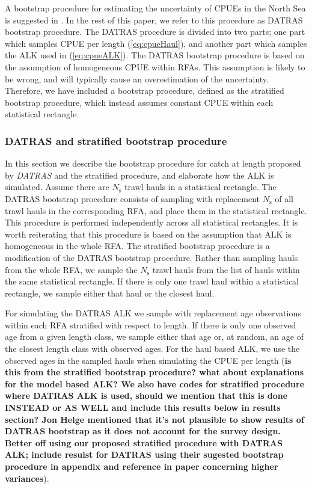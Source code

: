 \documentclass[a4paper 12pt]{article}
\numberwithin{equation}{section}
\begin{document}
A bootstrap procedure for estimating the uncertainty of CPUEs in the North Sea is suggested in  \citet{ICES2013}. In the rest of this paper, we refer to this procedure as DATRAS bootstrap procedure. The DATRAS procedure is divided into two parts; one part which samples CPUE per length (\ref{eq:cpueHaul}), and another part which samples the ALK used in (\ref{eq:cpueALK}). The DATRAS bootstrap procedure is based on the assumption of homogeneous CPUE within RFAs. This assumption is likely to be wrong, and will typically cause an overestimation of the uncertainty. Therefore, we have included a bootstrap procedure, defined as the stratified bootstrap procedure, which instead assumes constant CPUE within each statistical rectangle. 

\subsubsection{DATRAS and stratified bootstrap procedure}
\indent In this section we describe the bootstrap procedure for catch at length proposed by \emph{DATRAS} \citep{ICES2013} and the stratified procedure, and elaborate how the ALK is simulated. Assume there are $N_{\text{s}}$ trawl hauls in a statistical rectangle. The DATRAS bootstrap procedure consists of sampling with replacement $N_{\text{s}}$ of all trawl hauls in the corresponding RFA, and place them in the statistical rectangle. This procedure is performed independently across all statistical rectangles. It is worth reiterating that this procedure is based on the assumption that ALK is homogeneous in the whole RFA. The stratified bootstrap procedure is a modification of the DATRAS bootstrap procedure. Rather than sampling hauls from the whole RFA, we  sample the $N_{\text{s}}$ trawl hauls from the list of hauls within the same statistical rectangle. If there is only one trawl haul within a statistical rectangle, we sample either that haul or the closest haul.

For simulating the DATRAS ALK we sample with replacement age observations within each RFA stratified with respect to length. If there is only one observed age from a given length class, we sample either that age or, at random, an age of the closest length class with observed ages. For the haul based ALK, we use the observed ages in the sampled hauls when simulating the CPUE per length ({\bf is this from the stratified bootstrap procedure? what about explanations for the model based ALK? We also have codes for stratified procedure where DATRAS ALK is used, should we mention that this is done INSTEAD or AS WELL and include this results below in results section? Jon Helge mentioned that it's not plausible to show results of DATRAS bootstrap as it does not account for the survey design. Better off using our proposed stratified procedure with DATRAS ALK; include resulst for DATRAS using their sugested bootstrap procedure in appendix and reference in paper concerning higher variances}).
\end{document}

